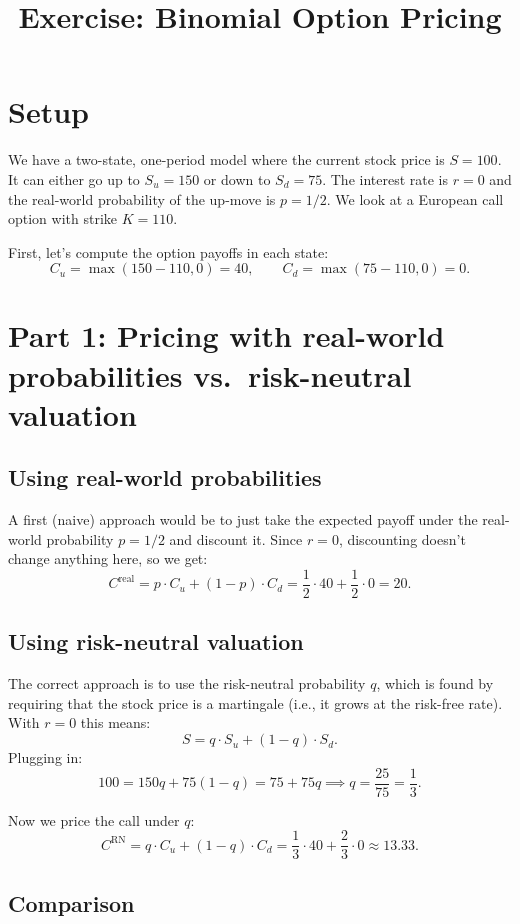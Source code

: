 \documentclass[12pt,a4paper]{article}
\title{Exercise: Binomial Option Pricing}
\author{}
\date{}
\begin{document}
\maketitle

\section*{Setup}

We have a two-state, one-period model where the current stock price is $S = 100$. It can either go up to $S_u = 150$ or down to $S_d = 75$. The interest rate is $r = 0$ and the real-world probability of the up-move is $p = 1/2$. We look at a European call option with strike $K = 110$.

First, let's compute the option payoffs in each state:
\[
C_u = \max(150 - 110, 0) = 40, \qquad C_d = \max(75 - 110, 0) = 0.
\]

\section*{Part 1: Pricing with real-world probabilities vs.\ risk-neutral valuation}

\subsection*{Using real-world probabilities}

A first (naive) approach would be to just take the expected payoff under the real-world probability $p = 1/2$ and discount it. Since $r = 0$, discounting doesn't change anything here, so we get:
\[
C^{\text{real}} = p \cdot C_u + (1-p) \cdot C_d = \frac{1}{2} \cdot 40 + \frac{1}{2} \cdot 0 = 20.
\]

\subsection*{Using risk-neutral valuation}

The correct approach is to use the risk-neutral probability $q$, which is found by requiring that the stock price is a martingale (i.e., it grows at the risk-free rate). With $r = 0$ this means:
\[
S = q \cdot S_u + (1-q) \cdot S_d.
\]
Plugging in:
\[
100 = 150q + 75(1-q) = 75 + 75q \implies q = \frac{25}{75} = \frac{1}{3}.
\]

Now we price the call under $q$:
\[
C^{\text{RN}} = q \cdot C_u + (1-q) \cdot C_d = \frac{1}{3} \cdot 40 + \frac{2}{3} \cdot 0 \approx 13.33.
\]

\subsection*{Comparison}
\end{document}
